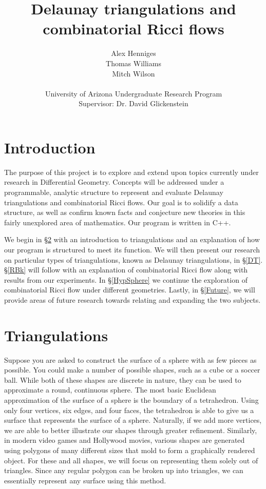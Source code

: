\documentclass[12pt]{article}
\title{Delaunay triangulations and combinatorial Ricci flows}
\author{Alex Henniges \\ Thomas Williams \\ Mitch Wilson \\ \\ University of Arizona Undergraduate Research Program\\
Supervisor: Dr. David Glickenstein\\
}
\begin{document}
\maketitle
\thispagestyle{empty}
\newpage
\renewcommand\contentsname{Table of Contents}
\tableofcontents

  


\newpage
\section{Introduction}

The purpose of this project is to explore and extend upon topics currently under research in Differential Geometry. Concepts will be addressed under a programmable, analytic structure to represent and evaluate Delaunay triangulations and combinatorial Ricci flows. Our goal is to solidify a data structure, as well as confirm known facts and conjecture new theories in this fairly unexplored area of mathematics. Our program is written in C++.\newline

\noindent We begin in \S\ref{Triangulationschap} with an introduction to triangulations and an explanation of how our program is structured to meet its function. We will then present our research on particular types of triangulations, known as Delaunay triangulations, in \S\ref{DT}. \S\ref{RBk} will follow with an explanation of combinatorial Ricci flow along with results from our experiments. In \S\ref{HypSphere} we continue the exploration of combinatorial Ricci flow under different geometries. Lastly, in \S\ref{Future}, we will provide areas of future research towards relating and expanding the two subjects.

\section{Triangulations}
\label{Triangulationschap}

Suppose you are asked to construct the surface of a sphere with as few pieces as possible. You could make a number of possible shapes, such as a cube or a soccer ball. While both of these shapes are discrete in nature, they can be used to approximate a round, continuous sphere. The most basic Euclidean approximation of the surface of a sphere is the boundary of a tetrahedron. Using only four vertices, six edges, and four faces, the tetrahedron is able to give us a surface that represents the surface of a sphere. Naturally, if we add more vertices, we are able to better illustrate our shapes through greater refinement. Similarly, in modern video games and Hollywood movies, various shapes are generated using polygons of many different sizes that mold to form a graphically rendered object. For these and all shapes, we will focus on representing them solely out of triangles. Since any regular polygon can be broken up into triangles, we can essentially represent any surface using this method. \newline
\end{document}
